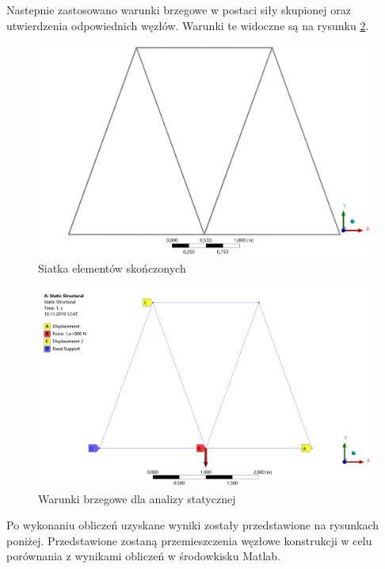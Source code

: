 \documentclass[12pt, a4papper, twoside]{article}
\begin{document}
Nastepnie zastosowano warunki brzegowe w postaci siły skupionej oraz utwierdzenia odpowiednich węzłów. Warunki te widoczne są na rysunku \ref{rys:warunkibrzegowe}.

\newpage

\begin{figure}[H]
    \centering
    \includegraphics[width=\textwidth, height=0.6\textwidth]{ModelgeomZSiatka.png}
    \caption{Siatka elementów skończonych}
    \label{rys:modelsiatki}
\end{figure}


\begin{figure}[H]
    \centering
    \includegraphics[width=\textwidth, height=0.6\textwidth]{StructuralSettings.png}
    \caption{Warunki brzegowe dla analizy statycznej}
    \label{rys:warunkibrzegowe}
\end{figure}

Po wykonaniu obliczeń uzyskane wyniki zostały przedstawione na rysunkach poniżej. Przedstawione zostaną przemieszczenia węzłowe konstrukcji w celu porównania z wynikami obliczeń w środowkisku Matlab.
\end{document}
